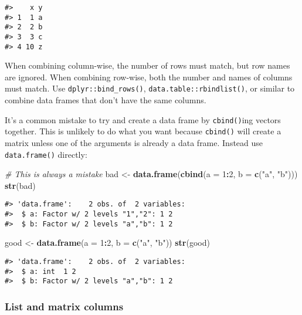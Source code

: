 \documentclass[]{book}
\newenvironment{Shaded}{\begin{snugshade}}{\end{snugshade}}
\newcommand{\KeywordTok}[1]{\textcolor[rgb]{0.13,0.29,0.53}{\textbf{#1}}}
\newcommand{\DataTypeTok}[1]{\textcolor[rgb]{0.13,0.29,0.53}{#1}}
\newcommand{\DecValTok}[1]{\textcolor[rgb]{0.00,0.00,0.81}{#1}}
\newcommand{\StringTok}[1]{\textcolor[rgb]{0.31,0.60,0.02}{#1}}
\newcommand{\CommentTok}[1]{\textcolor[rgb]{0.56,0.35,0.01}{\textit{#1}}}
\newcommand{\OperatorTok}[1]{\textcolor[rgb]{0.81,0.36,0.00}{\textbf{#1}}}
\newcommand{\NormalTok}[1]{#1}
\theoremstyle{definition}
\theoremstyle{definition}
\theoremstyle{definition}
\theoremstyle{remark}
\begin{document}
\begin{verbatim}
#>    x y
#> 1  1 a
#> 2  2 b
#> 3  3 c
#> 4 10 z
\end{verbatim}

When combining column-wise, the number of rows must match, but row names
are ignored. When combining row-wise, both the number and names of
columns must match. Use \texttt{dplyr::bind\_rows()},
\texttt{data.table::rbindlist()}, or similar to combine data frames that
don't have the same columns.

It's a common mistake to try and create a data frame by
\texttt{cbind()}ing vectors together. This is unlikely to do what you
want because \texttt{cbind()} will create a matrix unless one of the
arguments is already a data frame. Instead use \texttt{data.frame()}
directly:

\begin{Shaded}
\begin{Highlighting}[]
\CommentTok{# This is always a mistake}
\NormalTok{bad <-}\StringTok{ }\KeywordTok{data.frame}\NormalTok{(}\KeywordTok{cbind}\NormalTok{(}\DataTypeTok{a =} \DecValTok{1}\OperatorTok{:}\DecValTok{2}\NormalTok{, }\DataTypeTok{b =} \KeywordTok{c}\NormalTok{(}\StringTok{"a"}\NormalTok{, }\StringTok{"b"}\NormalTok{)))}
\KeywordTok{str}\NormalTok{(bad)}
\end{Highlighting}
\end{Shaded}

\begin{verbatim}
#> 'data.frame':    2 obs. of  2 variables:
#>  $ a: Factor w/ 2 levels "1","2": 1 2
#>  $ b: Factor w/ 2 levels "a","b": 1 2
\end{verbatim}

\begin{Shaded}
\begin{Highlighting}[]
\NormalTok{good <-}\StringTok{ }\KeywordTok{data.frame}\NormalTok{(}\DataTypeTok{a =} \DecValTok{1}\OperatorTok{:}\DecValTok{2}\NormalTok{, }\DataTypeTok{b =} \KeywordTok{c}\NormalTok{(}\StringTok{"a"}\NormalTok{, }\StringTok{"b"}\NormalTok{))}
\KeywordTok{str}\NormalTok{(good)}
\end{Highlighting}
\end{Shaded}

\begin{verbatim}
#> 'data.frame':    2 obs. of  2 variables:
#>  $ a: int  1 2
#>  $ b: Factor w/ 2 levels "a","b": 1 2
\end{verbatim}

\subsubsection{List and matrix columns}\label{list-and-matrix-columns}
\end{document}
